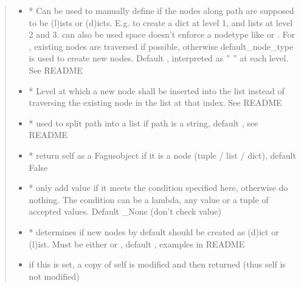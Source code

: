 \documentclass[a4paper,10pt,english]{sphinxmanual}
\begin{document}
\begin{fulllineitems}
\begin{fulllineitems}
\begin{quote}
\begin{description}
\begin{itemize}
\item {}
\sphinxAtStartPar
{} \textendash{} * Can be used to manually define if the nodes along path are supposed to be (l)ists or
(d)icts. E.g.  to create a dict at level 1, and lists at level 2 and 3.  can also be
used \textendash{} space doesn’t enforce a node\sphinxhyphen{}type like  or . For , existing nodes are
traversed if possible, otherwise default\_node\_type is used to create new nodes. Default ,
interpreted as ” ” at each level. See README

\item {}
\sphinxAtStartPar
{} \textendash{} * Level at which a new node shall be inserted into the list instead of traversing the
existing node in the list at that index. See README

\item {}
\sphinxAtStartPar
{} \textendash{} * used to split path into a list if path is a string, default , see README

\item {}
\sphinxAtStartPar
{} \textendash{} * return self as a Fagus\sphinxhyphen{}object if it is a node (tuple / list / dict), default False

\item {}
\sphinxAtStartPar
{} \textendash{} * only add value if it meets the condition specified here, otherwise do nothing. The condition can
be a lambda, any value or a tuple of accepted values. Default \_None (don’t check value)

\item {}
\sphinxAtStartPar
{} \textendash{} * determines if new nodes by default should be created as (d)ict or (l)ist. Must be
either  or , default , examples in README

\item {}
\sphinxAtStartPar
{} \textendash{} if this is set, a copy of self is modified and then returned (thus self is not modified)


\end{itemize}
\end{description}
\end{quote}
\end{fulllineitems}
\end{fulllineitems}
\end{document}
